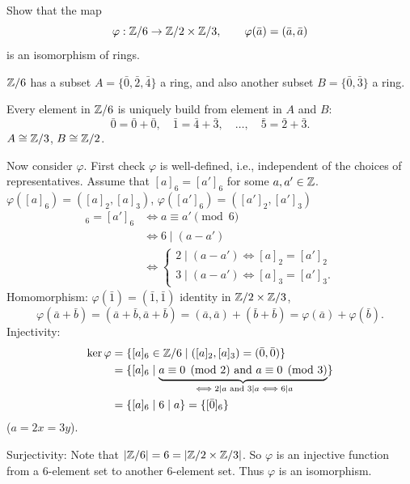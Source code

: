 \documentclass[10pt, a4paper]{article}
\begin{document}
\begin{problem}
    Show that the map
    \[
    \varphi : \mathbb{Z} / 6 \to \mathbb{Z} / 2 \times \mathbb{Z} / 3,\qquad\varphi(\bar{a}) = (\bar{a}, \bar{a})
    \]
    is an isomorphism of rings.

    \begin{solution}
        $\mathbb{Z} / 6$ has a subset $A = \{\bar{0}, \bar{2}, \bar{4}\}$ a ring,
        and also another subset $B = \{\bar{0}, \bar{3}\}$ a ring.

        Every element in $\mathbb{Z} / 6$ is uniquely build from element in $A$ and $B$:
        \[
        \bar{0} = \bar{0} + \bar{0},\quad \bar{1} = \bar{4} + \bar{3},\quad \dotsc,\quad \bar{5} = \bar{2} + \bar{3}.
        \]
        $A \cong \mathbb{Z} / 3$,
        $B \cong \mathbb{Z} / 2$.

        Now consider $\varphi$.
        First check $\varphi$ is well-defined,
        i.e.,
        independent of the choices of representatives.
        Assume that $[a]_{6} = [a']_{6}$ for some $a, a' \in \mathbb{Z}$.
        $\varphi([a]_{6}) = ([a]_{2}, [a]_{3})$,
        $\varphi([a']_{6}) = ([a']_{2}, [a']_{3})$
        \begin{align*}
            [a]_{6} = [a']_{6} &\iff a \equiv a'\pmod{6} \\
            &\iff 6 \mid (a - a') \\
            &\iff \begin{cases}
                2 \mid (a - a') \iff [a]_{2} = [a']_{2} \\
                3 \mid (a - a') \iff [a]_{3} = [a']_{3}.
            \end{cases}
        \end{align*}
        Homomorphism:
        $\varphi(\bar{1}) = (\bar{1}, \bar{1})$ identity in $\mathbb{Z} / 2 \times \mathbb{Z} / 3$,
        \[
        \varphi(\bar{a} + \bar{b}) = (\bar{a} + \bar{b}, \bar{a} + \bar{b}) = (\bar{a}, \bar{a}) + (\bar{b} + \bar{b}) = \varphi(\bar{a}) + \varphi(\bar{b}).
        \]
        Injectivity:
        \begin{align*}
            \ker{\varphi} &= \{[a]_{6} \in \mathbb{Z} / 6 \mid ([a]_{2}, [a]_{3}) = (\bar{0}, \bar{0})\} \\
            &= \{[a]_{6} \mid \underbrace{a \equiv 0\pmod{2} \text{ and } a \equiv 0\pmod{3}}_{\iff 2 \mid a\text{ and } 3 \mid a \iff 6 \mid a}\} \\
            &= \{[a]_{6} \mid 6 \mid a\} = \{[\bar{0}]_{6}\}
        \end{align*}
        ($a = 2x = 3y$).

        Surjectivity:
        Note that $|\mathbb{Z} / 6| = 6 = |\mathbb{Z} / 2 \times \mathbb{Z} / 3|$.
        So $\varphi$ is an injective function from a $6$-element set to another $6$-element set.
        Thus $\varphi$ is an isomorphism.
    \end{solution}
\end{problem}
\end{document}
